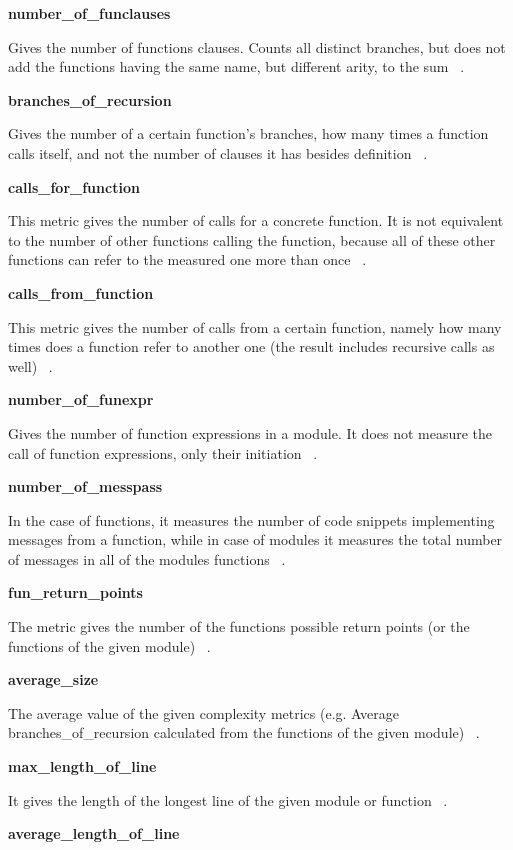 \textbf{number\_of\_funclauses}

Gives the number of functions clauses. Counts all distinct branches, but does not add the functions having the same name, but different arity, to the sum ~\cite{refactorerlm}.

\textbf{branches\_of\_recursion}

Gives the number of a certain function's branches, how many times a function calls itself, and not the number of clauses it has besides definition ~\cite{refactorerlm}.

\textbf{calls\_for\_function}

This metric gives the number of calls for a concrete function. It is not equivalent to the number of other functions calling the function, because all of these other functions can refer to the measured one more than once ~\cite{refactorerlm}.

\textbf{calls\_from\_function}

This metric gives the number of calls from a certain function, namely how many times does a function refer to another one (the result includes recursive calls as well) ~\cite{refactorerlm}.

\textbf{number\_of\_funexpr}

Gives the number of function expressions in a module. It does not measure the call of function expressions, only their initiation ~\cite{refactorerlm}.

\textbf{number\_of\_messpass}

In the case of functions, it measures the number of code snippets implementing messages from a function, while in case of modules it measures the total number of messages in all of the modules functions ~\cite{refactorerlm}.

\textbf{fun\_return\_points}

The metric gives the number of the functions possible return points (or the functions of the given module) ~\cite{refactorerlm}.

\textbf{average\_size}

The average value of the given complexity metrics (e.g. Average branches\_of\_recursion calculated from the functions of the given module) ~\cite{refactorerlm}.

\textbf{max\_length\_of\_line}

It gives the length of the longest line of the given module or function ~\cite{refactorerlm}.

\textbf{average\_length\_of\_line}


